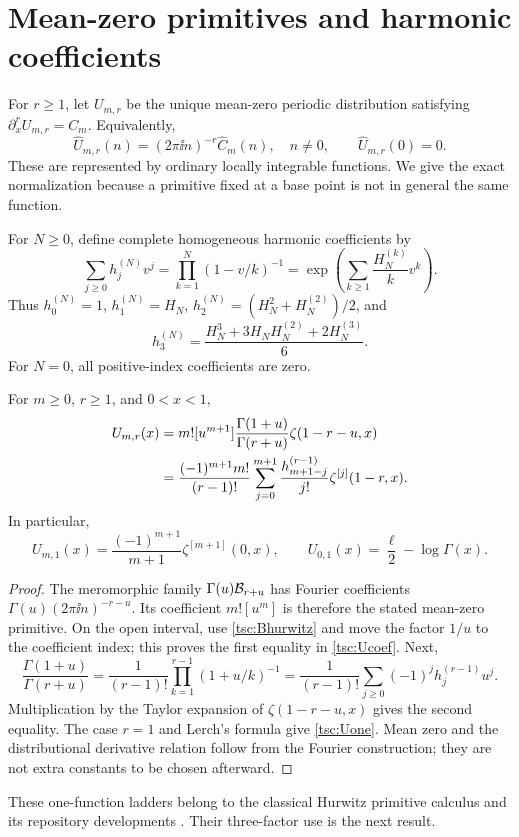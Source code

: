 \section{Mean-zero primitives and harmonic coefficients}\label{tsc:primitives}
For $r\ge1$, let $U_{m,r}$ be the unique mean-zero periodic distribution
satisfying $\partial_x^r U_{m,r}=C_m$. Equivalently,
\[
 \widehat U_{m,r}(n)=(2\pi\ii n)^{-r}\widehat C_m(n),\quad n\ne0,
 \qquad \widehat U_{m,r}(0)=0.
\]
These are represented by ordinary locally integrable functions. We give
the exact normalization because a primitive fixed at a base point is not
in general the same function.

For $N\ge0$, define complete homogeneous harmonic coefficients by
\begin{equation}\label{tsc:homogeneous}
 \sum_{j\ge0}h_j^{(N)}v^j
     =\prod_{k=1}^N(1-v/k)^{-1}
     =\exp\left(\sum_{k\ge1}\frac{H_N^{(k)}}k v^k\right).
\end{equation}
Thus $h_0^{(N)}=1$, $h_1^{(N)}=H_N$,
$h_2^{(N)}=(H_N^2+H_N^{(2)})/2$, and
\[
 h_3^{(N)}=\frac{H_N^3+3H_NH_N^{(2)}+2H_N^{(3)}}6.
\]
For $N=0$, all positive-index coefficients are zero.

\begin{proposition}\label{tsc:primitive-formula}
For $m\ge0$, $r\ge1$, and $0<x<1$,
\begin{align}\label{tsc:Ucoef}
 U_{m,r}(x)
 &=m![u^{m+1}]\frac{\Gamma(1+u)}{\Gamma(r+u)}\zeta(1-r-u,x)\notag\\
 &=\frac{(-1)^{m+1}m!}{(r-1)!}
       \sum_{j=0}^{m+1}\frac{h_{m+1-j}^{(r-1)}}{j!}
                   \zeta^{[j]}(1-r,x).
\end{align}
In particular,
\begin{equation}\label{tsc:Uone}
 U_{m,1}(x)=\frac{(-1)^{m+1}}{m+1}\zeta^{[m+1]}(0,x),
 \qquad U_{0,1}(x)=\frac\ell2-\log\Gamma(x).
\end{equation}
\end{proposition}
\begin{proof}
The meromorphic family $\Gamma(u)\mathcal B_{r+u}$ has Fourier coefficients
$\Gamma(u)(2\pi\ii n)^{-r-u}$. Its coefficient $m![u^m]$ is therefore
the stated mean-zero primitive. On the open interval, use
\eqref{tsc:Bhurwitz} and move the factor $1/u$ to the coefficient index;
this proves the first equality in \eqref{tsc:Ucoef}. Next,
\[
 \frac{\Gamma(1+u)}{\Gamma(r+u)}
   =\frac1{(r-1)!}\prod_{k=1}^{r-1}(1+u/k)^{-1}
   =\frac1{(r-1)!}\sum_{j\ge0}(-1)^jh_j^{(r-1)}u^j.
\]
Multiplication by the Taylor expansion of $\zeta(1-r-u,x)$ gives the second
equality. The case $r=1$ and Lerch's formula give \eqref{tsc:Uone}.
Mean zero and the distributional derivative relation follow from the Fourier
construction; they are not extra constants to be chosen afterward.
\end{proof}
These one-function ladders belong to the classical Hurwitz primitive
calculus and its repository developments \cite{tsc:em2,tsc:shj}. Their
three-factor use is the next result.


